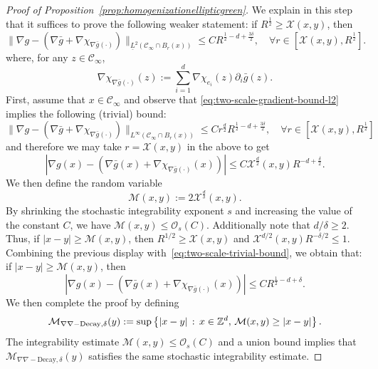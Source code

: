 \documentclass[12pt]{amsart}
\numberwithin{equation}{section}
\begin{document}
\begin{proof}[Proof of Proposition~\ref{prop:homogenizationellipticgreen}]
		We explain in this step that it suffices to prove the following weaker statement:  if $R^{\frac{1}{2}} \geq \mathcal{X}(x,y)$, then
		\begin{equation} \label{eq:two-scale-gradient-bound-l2}
			\| \nabla g - (\nabla \bar{g} + \nabla \chi_{\nabla \bar{g}(\cdot) }) \|_{\underline{L}^2(\mathscr{C}_{\infty} \cap B_r(x))}
			\leq C R^{ \frac{1}{2}- d + \frac{3\delta}{2}}, \quad \forall r \in [\mathcal{X}(x,y), R^{\frac{1}{2}}].
		\end{equation}
		where, for any $z \in \mathscr{C}_\infty$,
		\[
		\nabla \chi_{\nabla \bar{g}(\cdot) }(z) :=  \sum_{i = 1}^d \nabla \chi_{e_i}(z) \partial_i \bar g(z) .
		\]
		First, assume that $x \in \mathscr{C}_\infty$ and observe that \eqref{eq:two-scale-gradient-bound-l2} implies the following (trivial) bound: 
		\[
		\| \nabla g - (\nabla \bar{g} + \nabla \chi_{\nabla \bar{g}(\cdot) }) \|_{{L}^\infty(\mathscr{C}_{\infty} \cap B_r(x))}\leq C r^{\frac{d}{2}} R^{ \frac{1}{2}- d + \frac{3\delta}{2}}, \quad \forall r \in [\mathcal{X}(x,y), R^{\frac{1}{2}}]
		\]
		and therefore we may take $r = \mathcal{X}(x,y)$ in the above to get
		\begin{equation} \label{eq:two-scale-trivial-bound}
			| \nabla g(x) - (\nabla \bar{g}(x) + \nabla \chi_{\nabla \bar{g}(\cdot) }(x))| \leq C \mathcal{X}^{\frac{d}{2}}(x,y) R^{- d + \frac{\delta}{2}}.
		\end{equation}
		We then define the random variable
		\begin{equation*}
			\mathcal{M}(x , y) := 2 \mathcal{X}^{\frac{d}{\delta}}(x , y).
		\end{equation*}
		By shrinking the stochastic integrability exponent $s$ and increasing the value of the constant $C$, we have $\mathcal{M}(x , y) \leq \mathcal{O}_s(C)$. Additionally note that $d/\delta \geq 2$. Thus, if $|x - y| \geq \mathcal{M}(x , y)$, then $R^{1/2}\geq \mathcal{X}(x , y)$ and $\mathcal{X}^{d/2}(x , y) R^{-\delta/2} \leq 1.$ Combining the previous display with~\eqref{eq:two-scale-trivial-bound}, we obtain that: if $|x - y| \geq \mathcal{M}(x , y)$, then
		\begin{equation*}
			| \nabla g(x) - (\nabla \bar{g}(x) + \nabla \chi_{\nabla \bar{g}(\cdot) }(x))| \leq C R^{\frac{1}{2}- d + \delta}.
		\end{equation*}
		We then complete the proof by defining 
		\begin{equation*}
			\mathcal{M}_{\nabla\nabla-\mathrm{Decay}, \delta}(y) := \sup \left\{ |x - y| \, : \, x \in \mathbb{Z}^d, \, \mathcal{M}(x , y) \geq |x - y| \right\}.
		\end{equation*}
		The integrability estimate $\mathcal{M}(x , y) \leq \mathcal{O}_s(C)$ and a union bound implies that $\mathcal{M}_{\nabla\nabla-\mathrm{Decay}, \delta}(y)$ satisfies the same stochastic integrability estimate.
		

\end{proof}
\end{document}
